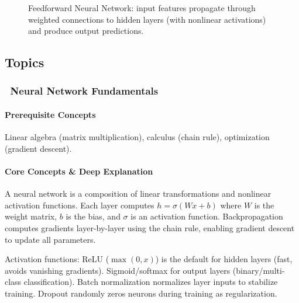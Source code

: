 \documentclass[11pt, a4paper, oneside]{report}
\newcommand{\mustmaster}[1]{\subsubsection{\texorpdfstring{\fcolorbox{blue!40!black}{blue!8}{\footnotesize\bfseries\color{blue!40!black} MUST MASTER}~#1}{#1}}}
\begin{document}
\begin{figure}[ht]
\centering
{}
\caption{Feedforward Neural Network: input features propagate through weighted connections to hidden layers (with nonlinear activations) and produce output predictions.}
\end{figure}

\subsection*{Topics}

\mustmaster{Neural Network Fundamentals}

\paragraph{Prerequisite Concepts} Linear algebra (matrix multiplication), calculus (chain rule), optimization (gradient descent).

\paragraph{Core Concepts \& Deep Explanation} A neural network is a composition of linear transformations and nonlinear activation functions. Each layer computes $h = \sigma(Wx + b)$ where $W$ is the weight matrix, $b$ is the bias, and $\sigma$ is an activation function. Backpropagation computes gradients layer-by-layer using the chain rule, enabling gradient descent to update all parameters.

Activation functions: ReLU ($\max(0,x)$) is the default for hidden layers (fast, avoids vanishing gradients). Sigmoid/softmax for output layers (binary/multi-class classification). Batch normalization normalizes layer inputs to stabilize training. Dropout randomly zeros neurons during training as regularization.
\end{document}
